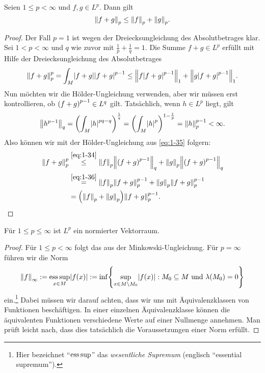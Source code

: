 \begin{lemma}
	Seien \(1 \le p < \infty\) und \(f, g \in L^p\).
	Dann gilt
	\[
		\norm*{f + g}_p \le \norm*{f}_p + \norm*{g}_p.
	\]
\end{lemma}

\begin{proof}
	Der Fall \(p = 1\) ist wegen der Dreiecksungleichung des Absolutbetrages klar.
	Sei \(1 < p < \infty\) und \(q\) wie zuvor mit \(\frac{1}{p} + \frac{1}{q} = 1\).
	Die Summe \(f + g \in L^p\) erfüllt mit Hilfe der Dreiecksungleichung des Absolutbetrages
	\begin{equation}\label{eq:1-35}
		\norm*{f + g}_p^p = \int_M \absolute*{f + g}\absolute*{f + g}^{p - 1} \le \norm*{f\absolute*{f + g}^{p - 1}}_1 + \norm*{g\absolute*{f + g}^{p - 1}}_1.
	\end{equation}
	Nun möchten wir die Hölder-Ungleichung verwenden, aber wir müssen erst kontrollieren, ob \(\parentheses*{f + g}^{p - 1} \in L^q\) gilt.
	Tatsächlich, wenn \(h \in L^p\) liegt, gilt
	\begin{equation}\label{eq:1-36}
		\norm*{h^{p - 1}}_q = \parentheses*{\int_M \absolute*{h}^{pq - q}}^{\frac{1}{q}} = \parentheses*{\int_M \absolute*{h}^p}^{1 - \frac{1}{p}} = \norm*{h}_p^{p - 1} < \infty.
	\end{equation}
	Also können wir mit der Hölder-Ungleichung aus \eqref{eq:1-35} folgern:
	\begin{align*}
		\norm*{f + g}_p^p &\stackrel{\eqref{eq:1-34}}{\le} \norm*{f}_p \norm*{\parentheses*{f + g}^{p - 1}}_q + \norm*{g}_p \norm*{\parentheses*{f + g}^{p - 1}}_q\\
		&\stackrel{\eqref{eq:1-36}}{=} \norm*{f}_p \norm*{f + g}_p^{p - 1} + \norm*{g}_p \norm*{f + g}_p^{p - 1}\\
		&= \parentheses*{\norm*{f}_p + \norm*{g}_p}\norm*{f + g}_p^{p - 1}.
	\end{align*}
\end{proof}

\begin{lemma}
	Für \(1 \le p \le \infty\) ist \(L^p\) ein normierter Vektorraum.
\end{lemma}

\begin{proof}
	Für \(1 \le p < \infty\) folgt das aus der Minkowski-Ungleichung.
	Für \(p = \infty\) führen wir die Norm
	\begin{equation}
		\norm*{f}_\infty := \esssup_{x \in M}\absolute*{f\parentheses*{x}} := \inf\braces*{\sup_{x \in M \setminus M_0}\absolute*{f\parentheses*{x}} : M_0 \subseteq M\text{ und }\lambda\parentheses*{M_0} = 0}
	\end{equation}
	ein.\footnote{Hier bezeichnet ``\(\esssup\)'' das \emph{wesentliche Supremum} (englisch ``essential supremum'').}
	Dabei müssen wir darauf achten, dass wir uns mit Äquivalenzklassen von Funktionen beschäftigen.
	In einer einzelnen Äquivalenzklasse können die äquivalenten Funktionen verschiedene Werte auf einer Nullmenge annehmen.
	Man prüft leicht nach, dass dies tatsächlich die Voraussetzungen einer Norm erfüllt.
\end{proof}

